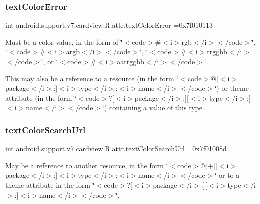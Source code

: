 \subsubsection{\texorpdfstring{text\+Color\+Error}{textColorError}}
{\footnotesize\ttfamily int android.\+support.\+v7.\+cardview.\+R.\+attr.\+text\+Color\+Error =0x7f010113\hspace{0.3cm}{\ttfamily [static]}}

Must be a color value, in the form of \char`\"{}$<$code$>$\#$<$i$>$rgb$<$/i$>$$<$/code$>$\char`\"{}, \char`\"{}$<$code$>$\#$<$i$>$argb$<$/i$>$$<$/code$>$\char`\"{}, \char`\"{}$<$code$>$\#$<$i$>$rrggbb$<$/i$>$$<$/code$>$\char`\"{}, or \char`\"{}$<$code$>$\#$<$i$>$aarrggbb$<$/i$>$$<$/code$>$\char`\"{}. 

This may also be a reference to a resource (in the form \char`\"{}$<$code$>$@\mbox{[}$<$i$>$package$<$/i$>$\+:\mbox{]}$<$i$>$type$<$/i$>$\+:$<$i$>$name$<$/i$>$$<$/code$>$\char`\"{}) or theme attribute (in the form \char`\"{}$<$code$>$?\mbox{[}$<$i$>$package$<$/i$>$\+:\mbox{]}\mbox{[}$<$i$>$type$<$/i$>$\+:\mbox{]}$<$i$>$name$<$/i$>$$<$/code$>$\char`\"{}) containing a value of this type. \mbox{\label{classandroid_1_1support_1_1v7_1_1cardview_1_1R_1_1attr_a86da2cd11159845c8daaa8dbdda4e306}} 
\subsubsection{\texorpdfstring{text\+Color\+Search\+Url}{textColorSearchUrl}}
{\footnotesize\ttfamily int android.\+support.\+v7.\+cardview.\+R.\+attr.\+text\+Color\+Search\+Url =0x7f01008d\hspace{0.3cm}{\ttfamily [static]}}

May be a reference to another resource, in the form \char`\"{}$<$code$>$@\mbox{[}+\mbox{]}\mbox{[}$<$i$>$package$<$/i$>$\+:\mbox{]}$<$i$>$type$<$/i$>$\+:$<$i$>$name$<$/i$>$$<$/code$>$\char`\"{} or to a theme attribute in the form \char`\"{}$<$code$>$?\mbox{[}$<$i$>$package$<$/i$>$\+:\mbox{]}\mbox{[}$<$i$>$type$<$/i$>$\+:\mbox{]}$<$i$>$name$<$/i$>$$<$/code$>$\char`\"{}. 

